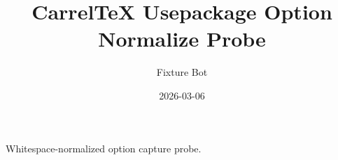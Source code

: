 \documentclass{article}
\title{CarrelTeX Usepackage Option Normalize Probe}
\author{Fixture Bot}
\date{2026-03-06}
\begin{document}
\maketitle

Whitespace-normalized option capture probe.
\end{document}
